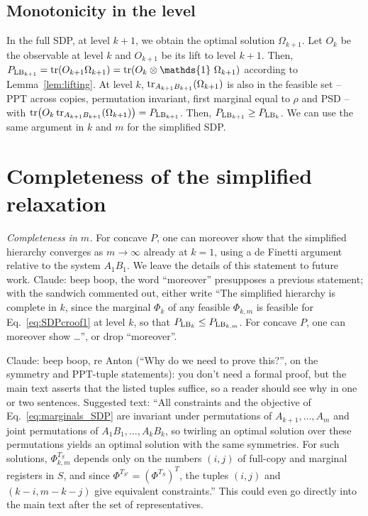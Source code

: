 \documentclass[aps,pra,twocolumn,showpacs,superscriptaddress,groupedaddress]{revtex4-2}
\newcommand{\one}[0]{\mathds{1}}
\newcommand{\claude}[1]{{\color{claudeorange} Claude: beep boop, #1}}
\newcommand{\I}{\one}
\begin{document}
\begin{widetext}
\subsection{Monotonicity in the level}\label{app:monotonicity}
In the full SDP, at level $k+1$, we obtain the optimal solution $\Omega_{k+1}$. Let $O_k$ be the observable at level $k$ and $O_{k+1}$ be its lift to level $k+1$. Then, $P_{\text{LB}_{k+1}} = \tr(O_{k+1} \Omega_{k+1})=\tr(O_k \otimes \I \ \Omega_{k+1})$ according to Lemma~\ref{lem:lifting}. At level $k$, $\tr_{A_{k+1}B_{k+1}}(\Omega_{k+1})$ is also in the feasible set -- PPT across copies, permutation invariant, first marginal equal to $\rho$ and PSD -- with $\tr(O_k \tr_{A_{k+1}B_{k+1}}(\Omega_{k+1})) = P_{\text{LB}_{k+1}}$. Then, $P_{{\rm LB}_{k+1}} \geq P_{{\rm LB}_{k}}$.
We can use the same argument in $k$ and $m$ for the simplified SDP.


\section{Completeness of the simplified relaxation}\label{app:simplified}
\emph{Completeness in $m$.} For concave $P$, one can moreover show that the simplified hierarchy converges as $m\to\infty$ already at $k=1$, using a de Finetti argument relative to the system $A_1B_1$. We leave the details of this statement to future work.
\claude{the word ``moreover'' presupposes a previous statement; with the sandwich commented out, either write ``The simplified hierarchy is complete in $k$, since the marginal $\Phi_k$ of any feasible $\Phi_{k,m}$ is feasible for Eq.~\eqref{eq:SDPcroof1} at level $k$, so that $P_{{\rm LB}_k}\leq P_{{\rm LB}_{k,m}}$. For concave $P$, one can moreover show \dots'', or drop ``moreover''.}

\claude{re Anton (``Why do we need to prove this?'', on the symmetry and PPT-tuple statements): you don't need a formal proof, but the main text asserts that the listed tuples suffice, so a reader should see why in one or two sentences. Suggested text: ``All constraints and the objective of Eq.~\eqref{eq:marginals_SDP} are invariant under permutations of $A_{k+1},\dots,A_m$ and joint permutations of $A_1B_1,\dots,A_kB_k$, so twirling an optimal solution over these permutations yields an optimal solution with the same symmetries. For such solutions, $\Phi_{k,m}^{T_S}$ depends only on the numbers $(i,j)$ of full-copy and marginal registers in $S$, and since $\Phi^{T_{S^c}}=(\Phi^{T_S})^T$, the tuples $(i,j)$ and $(k-i,m-k-j)$ give equivalent constraints.'' This could even go directly into the main text after the set of representatives.}


\end{widetext}
\end{document}
